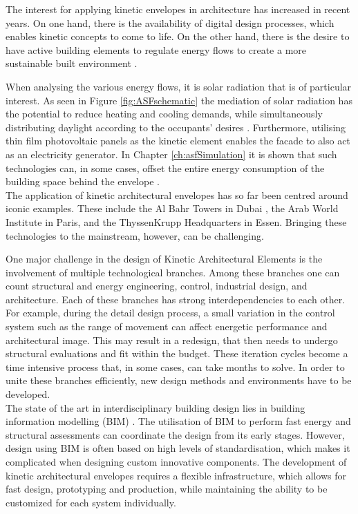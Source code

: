 
The interest for applying kinetic envelopes in architecture has increased in recent years. On one hand, there is the availability of digital design processes, which enables kinetic concepts to come to life. On the other hand, there is the desire to have active building elements to regulate energy flows to create a more sustainable built environment \cite{loonen2013climate}. 

When analysing the various energy flows, it is solar radiation that is of particular interest. As seen in Figure \ref{fig:ASFschematic} the mediation of solar radiation has the potential to reduce heating and cooling demands, while simultaneously distributing daylight according to the occupants' desires \cite{nagy2016adaptive}. Furthermore, utilising thin film photovoltaic panels as the kinetic element enables the facade to also act as an electricity generator. In Chapter \ref{ch:asfSimulation} it is shown that such technologies can, in some cases, offset the entire energy consumption of the building space behind the envelope \cite{jayathissa2017optimising}. \\

The application of kinetic architectural envelopes has so far been centred around iconic examples. These include the Al Bahr Towers in Dubai \cite{oborn2012bahr}, the Arab World Institute in Paris, and the ThyssenKrupp Headquarters in Essen. Bringing these technologies to the mainstream, however, can be challenging. 

One major challenge in the design of Kinetic Architectural Elements is the involvement of multiple technological branches. Among these branches one can count structural and energy engineering, control, industrial design, and architecture. Each of these branches has strong interdependencies to each other. For example, during the detail design process, a small variation in the control system such as the range of movement can affect energetic performance and architectural image. This may result in a redesign, that then needs to undergo structural evaluations and fit within the budget. These iteration cycles become a time intensive process that, in some cases, can take months to solve. In order to unite these branches efficiently, new design methods and environments have to be developed. \\

The state of the art in interdisciplinary building design lies in building information modelling (BIM) \cite{schlueter2009building, volk2014building}. The utilisation of BIM to perform fast energy and structural assessments can coordinate the design from its early stages. However, design using BIM is often based on high levels of standardisation, which makes it complicated when designing custom innovative components. The development of kinetic architectural envelopes requires a flexible infrastructure, which allows for fast design, prototyping and production, while maintaining the ability to be customized for each system individually. 

